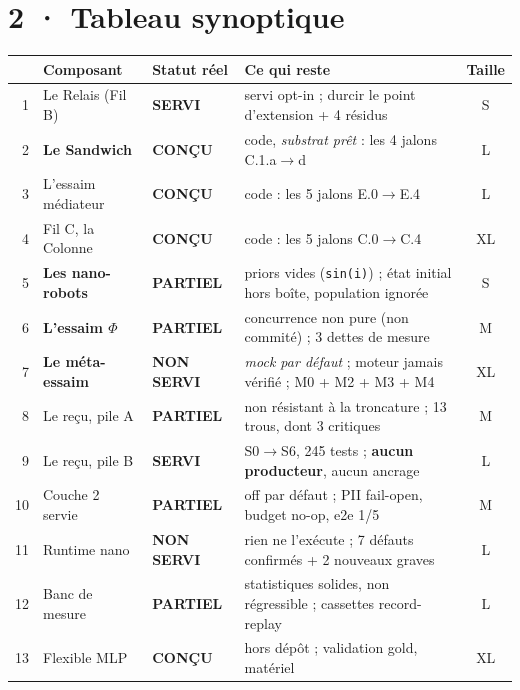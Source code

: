 \documentclass[10pt]{article}
\newcommand{\ok}{{\color{green}\textbf{SERVI}}}
\newcommand{\partiel}{{\color{amber}\textbf{PARTIEL}}}
\newcommand{\design}{{\color{grey}\textbf{CONÇU}}}
\newcommand{\nope}{{\color{red}\textbf{NON SERVI}}}
\newcommand{\sz}[1]{{\small\color{grey}\textsf{#1}}}
\newcommand{\code}[1]{\texttt{\small #1}}
\begin{document}
\section{2 · Tableau synoptique}

\renewcommand{\arraystretch}{1.12}
\begin{center}\small
\begin{tabular}{@{}rl l >{\raggedright\arraybackslash}p{8.1cm}c@{}}
\toprule
& \textbf{Composant} & \textbf{Statut réel} & \textbf{Ce qui reste} & \textbf{Taille} \\
\midrule
1 & Le Relais (Fil B) & \ok & servi opt-in ; durcir le point d'extension + 4 résidus & \sz{S} \\
2 & \textbf{Le Sandwich} & \design & 0 code, \emph{substrat prêt} : les 4 jalons C.1.a$\rightarrow$d & \sz{L} \\
3 & L'essaim médiateur & \design & 0 code : les 5 jalons E.0$\rightarrow$E.4 & \sz{L} \\
4 & Fil C, la Colonne & \design & 0 code : les 5 jalons C.0$\rightarrow$C.4 & \sz{XL} \\
5 & \textbf{Les nano-robots} & \partiel & priors vides (\code{sin(i)}) ; état initial hors boîte, population ignorée & \sz{S} \\
6 & \textbf{L'essaim $\Phi$} & \partiel & concurrence non pure (non commité) ; 3 dettes de mesure & \sz{M} \\
7 & \textbf{Le méta-essaim} & \nope & \emph{mock par défaut} ; moteur jamais vérifié ; M0 + M2 + M3 + M4 & \sz{XL} \\
8 & Le reçu, pile A & \partiel & non résistant à la troncature ; 13 trous, dont 3 critiques & \sz{M} \\
9 & Le reçu, pile B & \ok & S0$\rightarrow$S6, 245 tests ; \textbf{aucun producteur}, aucun ancrage & \sz{L} \\
10 & Couche 2 servie & \partiel & off par défaut ; PII fail-open, budget no-op, e2e 1/5 & \sz{M} \\
11 & Runtime nano & \nope & rien ne l'exécute ; 7 défauts confirmés + 2 nouveaux graves & \sz{L} \\
12 & Banc de mesure & \partiel & statistiques solides, non régressible ; cassettes record-replay & \sz{L} \\
13 & Flexible MLP & \design & hors dépôt ; validation gold, matériel & \sz{XL} \\
\bottomrule
\end{tabular}
\end{center}
\end{document}
